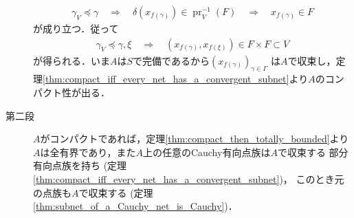 \begin{prf}
\begin{description}
				\begin{align}
					\gamma_V \preceq \gamma
					\quad \Longrightarrow \quad
					\delta(x_{f(\gamma)}) \in \operatorname{pr}_V^{-1}(F)
					\quad \Longrightarrow \quad
					x_{f(\gamma)} \in F
				\end{align}
				が成り立つ．従って
				\begin{align}
					\gamma_V \preceq \gamma,\xi
					\quad \Longrightarrow \quad
					\left(x_{f(\gamma)},x_{f(\xi)}\right) \in F \times F \subset V
				\end{align}
				が得られる．いま$A$は$S$で完備であるから$(x_{f(\gamma)})_{\gamma \in \Gamma}$
				は$A$で収束し，定理\ref{thm:compact_iff_every_net_has_a_convergent_subnet}より$A$のコンパクト性が出る．
				
			\item[第二段]
				$A$がコンパクトであれば，定理\ref{thm:compact_then_totally_bounded}より
				$A$は全有界であり，また$A$上の任意のCauchy有向点族は$A$で収束する
				部分有向点族を持ち
				(定理\ref{thm:compact_iff_every_net_has_a_convergent_subnet})，
				このとき元の点族も$A$で収束する
				(定理\ref{thm:subnet_of_a_Cauchy_net_is_Cauchy})．
				\QED
		\end{description}
	\end{prf}